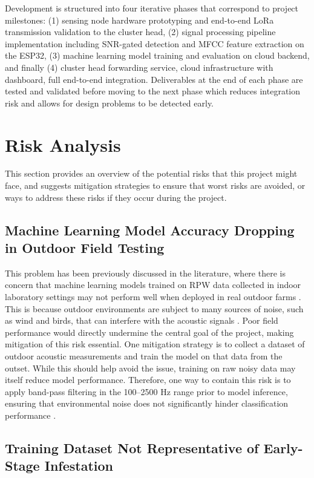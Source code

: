 \documentclass[12pt,a4paper,oneside]{memoir}
\begin{document}
Development is structured into four iterative phases that correspond to project milestones: (1) sensing node hardware prototyping and end-to-end LoRa transmission validation to the cluster head, (2) signal processing pipeline implementation including SNR-gated detection and MFCC feature extraction on the ESP32, (3) machine learning model training and evaluation on cloud backend, and finally (4) cluster head forwarding service, cloud infrastructure with dashboard, full end-to-end integration. Deliverables at the end of each phase are tested and validated before moving to the next phase which reduces integration risk and allows for design problems to be detected early.

\section{Risk Analysis}
\label{sec:RiskAnalysis}

This section provides an overview of the potential risks that this project might face, and suggests mitigation strategies to ensure that worst risks are avoided, or ways to address these risks if they occur during the project.

\subsection{Machine Learning Model Accuracy Dropping in Outdoor Field Testing}

This problem has been previously discussed in the literature, where there is concern that machine learning models trained on RPW data collected in indoor laboratory settings may not perform well when deployed in real outdoor farms \cite{pinhas2008}. This is because outdoor environments are subject to many sources of noise, such as wind and birds, that can interfere with the acoustic signals \cite{pinhas2008,rach2013}. Poor field performance would directly undermine the central goal of the project, making mitigation of this risk essential. One mitigation strategy is to collect a dataset of outdoor acoustic measurements and train the model on that data from the outset. While this should help avoid the issue, training on raw noisy data may itself reduce model performance. Therefore, one way to contain this risk is to apply band-pass filtering in the 100--2500 Hz range prior to model inference, ensuring that environmental noise does not significantly hinder classification performance \cite{ashry2022cnn,karar2022,saranya2025}.

\subsection{Training Dataset Not Representative of Early-Stage Infestation}
\end{document}
